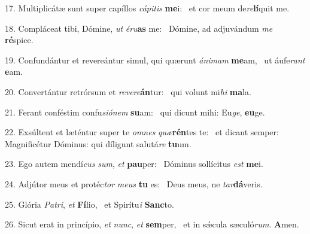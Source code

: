 17. Multiplicátæ sunt super capíllos \textit{cá}\textit{pi}\textit{tis} \textbf{me}i: \ast\  et cor meum de\textit{re}\textbf{lí}quit me.\

18. Compláceat tibi, Dómine, \textit{ut} \textit{é}\textit{ru}\textbf{as} me: \ast\  Dómine, ad adjuvándum \textit{me} \textbf{ré}spice.\

19. Confundántur et revereántur simul, qui quærunt \textit{á}\textit{ni}\textit{mam} \textbf{me}am, \ast\  ut áufe\textit{rant} \textbf{e}am.\

20. Convertántur retrórsum et \textit{re}\textit{ve}\textit{re}\textbf{án}tur: \ast\  qui volunt mi\textit{hi} \textbf{ma}la.\

21. Ferant conféstim confu\textit{si}\textit{ó}\textit{nem} \textbf{su}am: \ast\  qui dicunt mihi: Eu\textit{ge}, \textbf{eu}ge.\

22. Exsúltent et læténtur super te \textit{om}\textit{nes} \textit{quæ}\textbf{rén}tes te: \ast\  et dicant semper: Magnificétur Dóminus: qui díligunt salutá\textit{re} \textbf{tu}um.\

23. Ego autem mendí\textit{cus} \textit{sum}, \textit{et} \textbf{pau}per: \ast\  Dóminus sollícitus \textit{est} \textbf{me}i.\

24. Adjútor meus et protéc\textit{tor} \textit{me}\textit{us} \textbf{tu} es: \ast\  Deus meus, ne \textit{tar}\textbf{dá}veris.\

25. Glória \textit{Pa}\textit{tri}, \textit{et} \textbf{Fí}lio, \ast\  et Spirítu\textit{i} \textbf{Sanc}to.\

26. Sicut erat in princípio, \textit{et} \textit{nunc}, \textit{et} \textbf{sem}per, \ast\  et in sǽcula sæculó\textit{rum}. \textbf{A}men.\

